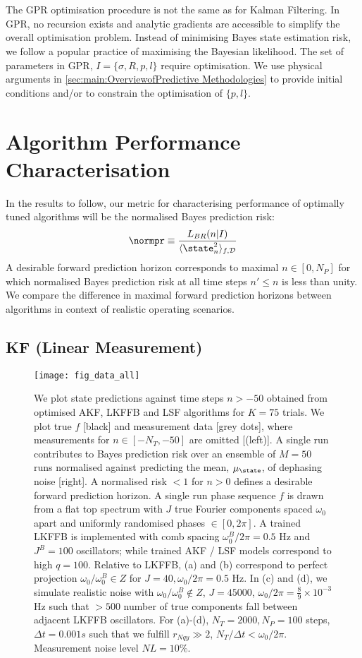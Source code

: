 \\
\\
The GPR optimisation procedure is not the same as for Kalman Filtering. In GPR, no recursion exists and analytic gradients are accessible to simplify the overall optimisation problem. Instead of minimising Bayes state estimation risk, we follow a popular practice of maximising the Bayesian likelihood. The set of parameters in GPR, $I = \{\sigma, R, p, l \}$ require optimisation. We use physical arguments in \cref{sec:main:OverviewofPredictive Methodologies} to provide initial conditions and/or to constrain the optimisation of $\{ p, l\}$. 

\section{Algorithm Performance Characterisation \label{sec:main:Performance}}

In the results to follow, our metric for characterising performance of optimally tuned algorithms will be the normalised Bayes prediction risk:
\begin{align}
\normpr \equiv \frac{L_{BR}(n|I)}{\langle \state_n^2 \rangle_{f, \mathcal{D}}} 
\end{align}
A desirable forward prediction horizon corresponds to maximal $n \in [0, N_P]$ for which normalised Bayes prediction risk at all time steps $n' \leq n$ is less than unity. We compare the difference in maximal forward prediction horizons between algorithms in context of realistic operating scenarios.
\subsection{KF (Linear Measurement)}
\begin{figure}
    \texttt{[image: fig\_data\_all]}
    \caption{\label{fig:main:fig_data_all} We plot state predictions against time steps $n > -50$ obtained from optimised AKF, LKFFB and LSF algorithms for $K=75$ trials. We plot true $f$ [black] and measurement data [grey dots], where measurements for $n \in [-N_T, -50]$ are omitted [(left)]. A single run contributes to Bayes prediction risk over an ensemble of $M=50$ runs normalised against predicting the mean, $\mu_\state$, of dephasing noise [right]. A normalised risk $<1$ for $n > 0$ defines a desirable forward prediction horizon. A single run phase sequence $f$ is drawn from a flat top spectrum with $J$ true Fourier components spaced $\omega_0$ apart and uniformly randomised phases $\in [0, 2\pi]$. A trained LKFFB is implemented with comb spacing $\omega_0^B / 2\pi = 0.5$ Hz and $J^B =100$ oscillators; while trained AKF / LSF models correspond to high $q = 100$. Relative to LKFFB,  (a) and (b) correspond to perfect projection $\omega_0 / \omega_0^B  \in Z $ for $J= 40, \omega_0 / 2\pi = 0.5$ Hz. In (c) and (d), we simulate realistic noise with $\omega_0 / \omega_0^B  \notin Z$, $J = 45000$, $\omega_0 / 2\pi = \frac{8}{9} \times 10^{-3}$ Hz such that $>500$ number of true components fall between adjacent LKFFB oscillators. For (a)-(d), $N_T = 2000, N_P = 100$ steps, $\Delta t = 0.001s$ such that we fulfill $r_{Nqy} \gg 2$, $N_T / \Delta t < \omega_0/2\pi$. Measurement noise level $ NL= 10\%$.}
\end{figure} 

